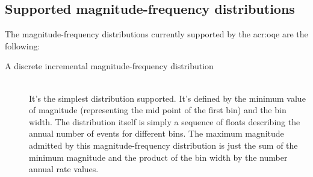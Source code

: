 \subsection{Supported magnitude-frequency distributions}
The magnitude-frequency distributions currently supported by the 
\gls{acr:oqe} are the following: 
\begin{description}
    \item[A discrete incremental magnitude-frequency distribution] \hfill \\
    It's the simplest distribution supported. It's defined by the 
    minimum value of magnitude (representing the mid point of the first
    bin) and the bin width. 
    The distribution itself is simply a sequence of floats describing the 
    annual number of events for different bins. The maximum magnitude 
    admitted by this magnitude-frequency distribution is just the sum of 
    the minimum magnitude and the product of the bin width by the number 
    annual rate values.


\end{description}
